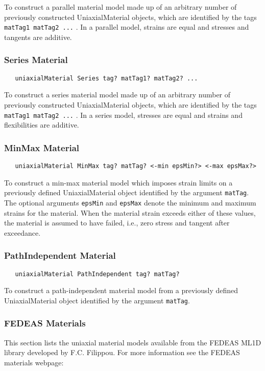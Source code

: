 \documentclass[12pt]{article}
\begin{document}
\noindent To construct a parallel material model made up of an
arbitrary number of previously constructed UniaxialMaterial objects, 
which are identified by the tags {\tt matTag1 matTag2 ...} .
In a parallel model,
strains are equal and stresses and tangents are additive.

\subsubsection{Series Material}
{\sf\small
\begin{verbatim}
   uniaxialMaterial Series tag? matTag1? matTag2? ... 
\end{verbatim}
}

\noindent To construct a series material model made up of an
arbitrary number of previously constructed UniaxialMaterial objects, 
which are identified by the tags {\tt matTag1 matTag2 ...} .
In a series model,
stresses are equal and strains and flexibilities are additive.

\subsubsection{MinMax Material}
{\sf\small
\begin{verbatim}
   uniaxialMaterial MinMax tag? matTag? <-min epsMin?> <-max epsMax?>
\end{verbatim}
}

\noindent To construct a min-max material model which imposes strain
limits on a previously defined UniaxialMaterial object identified by the
argument {\tt matTag}. The optional arguments {\tt epsMin} and
{\tt epsMax} denote
the minimum and maximum strains for the material. When the material strain
exceeds either of these values, the material is assumed to have failed, i.e.,
zero stress and tangent after exceedance.

\subsubsection{PathIndependent Material}
{\sf\small
\begin{verbatim}
   uniaxialMaterial PathIndependent tag? matTag?
\end{verbatim}
}

\noindent To construct a path-independent material model from a
previously defined UniaxialMaterial object identified by the argument
{\tt matTag}.

\subsubsection{FEDEAS Materials}
This section lists the uniaxial material models available from the FEDEAS ML1D
library developed by F.C. Filippou. For more information see the FEDEAS materials webpage:
\end{document}
